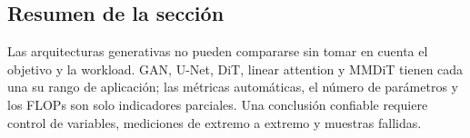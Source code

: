 \subsection{Resumen de la sección}

Las arquitecturas generativas no pueden compararse sin tomar en cuenta el objetivo y la workload. GAN, U-Net, DiT, linear attention y MMDiT tienen cada una su rango de aplicación; las métricas automáticas, el número de parámetros y los FLOPs son solo indicadores parciales. Una conclusión confiable requiere control de variables, mediciones de extremo a extremo y muestras fallidas.
